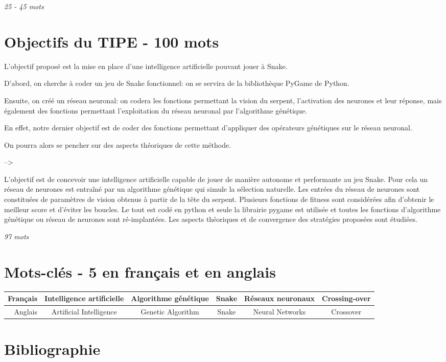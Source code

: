 \documentclass[11pt,a4paper]{article}
\begin{document}
\textit{25 - 45 mots}

\section{Objectifs du TIPE - 100 mots}

L'objectif proposé est la mise en place d'une intelligence artificielle pouvant jouer à Snake.

D'abord, on cherche à coder un jeu de Snake fonctionnel: on se servira de la bibliothèque PyGame de Python.

Ensuite, on créé un réseau neuronal: on codera les fonctions permettant la vision du serpent, l'activation des neurones et leur réponse, mais également des fonctions permettant l'exploitation du réseau neuronal par l'algorithme génétique.

En effet, notre dernier objectif est de coder des fonctions permettant d'appliquer des opérateurs génétiques sur le réseau neuronal.

On pourra alors se pencher sur des aspects théoriques de cette méthode.

-->

L'objectif est de concevoir une intelligence artificielle capable de jouer de manière autonome et performante au jeu Snake.
Pour cela un réseau de neurones est entraîné par un algorithme génétique qui simule la sélection naturelle.
Les entrées du réseau de neurones sont constituées de paramètres de vision obtenus à partir de la tête du serpent.
Plusieurs fonctions de fitness sont considérées afin d'obtenir le meilleur score et d'éviter les boucles.
Le tout est codé en python et seule la librairie pygame est utilisée et toutes les fonctions d'algorithme génétique ou réseau de neurones sont ré-implantées.
Les aspects théoriques et de convergence des stratégies proposées sont étudiées.


\textit{97 mots}

\section{Mots-clés - 5 en français et en anglais}

\footnotesize
\begin{tabular}{||r|c|c|c|c|c||} \hline
	Français & Intelligence artificielle & Algorithme génétique & Snake & Réseaux neuronaux & Crossing-over \\ \hline \hline
	Anglais & Artificial Intelligence & Genetic Algorithm & Snake & Neural Networks & Crossover \\
		\hline
	\end{tabular}

\section{Bibliographie}
\end{document}
